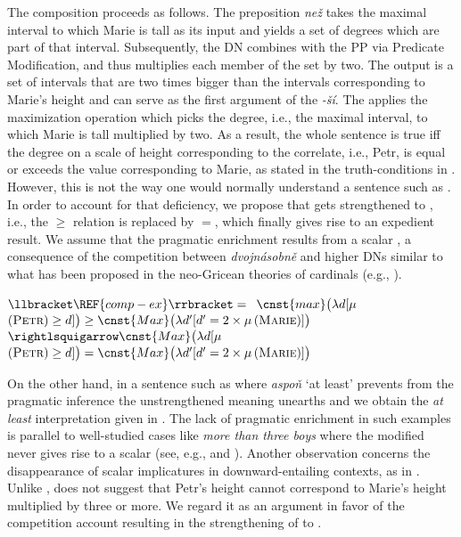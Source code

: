 \documentclass[output=paper,modfonts,hidelinks,newtxmath
\ChapterDOI{10.5281/zenodo.2545513}
]{langscibook}
\begin{document}
The composition proceeds as follows. The preposition \textit{než} takes the maximal interval to which Marie is tall as its input and yields a set of degrees which are part of that interval. Subsequently, the DN combines with the PP via Predicate Modification, and thus multiplies each member of the set by two. The output is a set of intervals that are two times bigger than the intervals corresponding to Marie's height and can serve as the first argument of the  \textit{-ší}. The  applies the maximization operation  which picks the degree, i.e., the maximal interval, to which Marie is tall multiplied by two. As a result, the whole sentence is true iff the degree on a scale of height corresponding to the correlate, i.e., Petr, is equal or exceeds the value corresponding to Marie, as stated in the truth-conditions in . However, this is not the way one would normally understand a sentence such as . In order to account for that deficiency, we propose that  gets strengthened to , i.e., the $\geq$ relation is replaced by $=$, which finally gives rise to an expedient result. We assume that the pragmatic enrichment results from a scalar , a consequence of the competition between \textit{dvojnásobně} and higher DNs similar to what has been proposed in the neo-Gricean theories of cardinals (e.g., \citealt{horn1972semantic}).

\ea\label{tree-comp-dvojnasobne-semantics} $\llbracket \REF{comp-ex}\rrbracket ={}$
\ea $\cnst{max}\big(\lambda d[\mu$$(\textsc{Petr})\geq d]\big) \geq \cnst{Max}\big(\lambda d'[d'=2 \times \mu$$(\textsc{Marie})]\big)$\label{tree-comp-dvojnasobne-semantics-a}
\ex $\rightlsquigarrow\cnst{Max}\big(\lambda d[\mu$$(\textsc{Petr})\geq d]\big) = \cnst{Max}\big(\lambda d'[d'=2 \times \mu$$(\textsc{Marie})]\big)$\label{tree-comp-dvojnasobne-semantics-b}
\z \z

\noindent On the other hand, in a sentence such as  where \textit{aspoň} `at least' prevents from the pragmatic inference the unstrengthened meaning unearths and we obtain the \textit{at least} interpretation given in . The lack of pragmatic enrichment in such examples is parallel to well-studied cases like \textit{more than three boys} where the modified  never gives rise to a scalar  (see, e.g., \citealt{krifka_at_1999} and \citealt{schulz_pragmatic_2006}). Another observation concerns the disappearance of scalar implicatures in downward-entailing contexts, as in . Unlike ,  does not suggest that Petr's height cannot correspond to Marie's height multiplied by three or more. We regard it as an argument in favor of the competition account resulting in the strengthening of  to .
\end{document}
